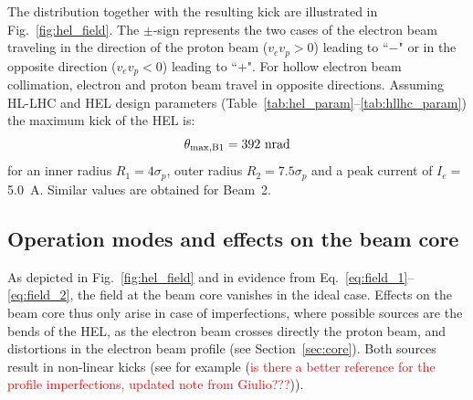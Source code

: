 \documentclass[%
 reprint,
 amsmath,amssymb,
 aps,
prstab,
]{revtex4-1}
\begin{document}
The distribution together with the resulting kick are illustrated in Fig.~\ref{fig:hel_field}. The $\pm$-sign represents the two cases of the electron beam traveling in the direction of the proton beam ($v_e v_p>0$) leading to ``$-$" or in the opposite direction ($v_e v_p<0$) leading to ``$+$". For hollow electron beam collimation, electron and proton beam travel in opposite directions. Assuming HL-LHC and HEL design parameters (Table~\ref{tab:hel_param}--\ref{tab:hllhc_param}) the maximum kick of the HEL is:
\begin{equation}
\theta_{\rm max,B1} = 392~\rm{nrad}
\end{equation}
for an inner radius $R_1=4\sigma_p$, outer radius $R_2=7.5\sigma_p$ and a peak current of $I_e=$\SI{5.0}{A}. Similar values are obtained for Beam~2.

\subsection{Operation modes and effects on the beam core\label{sec:hel:core}}
As depicted in Fig.~\ref{fig:hel_field} and in evidence from Eq.~\ref{eq:field_1}--\ref{eq:field_2}, the field at the beam core vanishes in the ideal case. Effects on the beam core thus only arise in case of imperfections, where possible sources are the bends of the HEL, as the electron beam crosses directly the proton beam, and distortions in the electron beam profile (see Section~\ref{sec:core}). Both sources result in non-linear kicks (see for example \cite{hel_bends_stancari,hel_model_polynomial_morozov} (\textcolor{red}{is there a better reference for the profile imperfections, updated note from Giulio???})).
\end{document}
